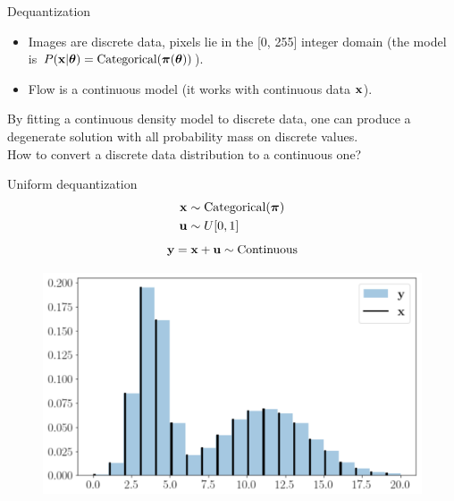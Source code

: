 \begin{frame}{Dequantization}
	\begin{itemize}
		\item Images are discrete data, pixels lie in the [0, 255] integer domain (the model is $P(\mathbf{x} | \boldsymbol{\theta}) = \text{Categorical}(\boldsymbol{\pi}(\boldsymbol{\theta}))$).
		\item Flow is a continuous model (it works with continuous data $\mathbf{x}$).
	\end{itemize}
	By fitting a continuous density model to discrete data, one can produce a degenerate solution with all probability mass on discrete values. \\
	How to convert a discrete data distribution to a continuous one?
	
	\begin{minipage}[t]{0.5\columnwidth}
		\begin{block}{Uniform dequantization}
		\vspace{-0.5cm}
			\begin{align*}
				\mathbf{x} &\sim \text{Categorical}(\boldsymbol{\pi}) \\
				 \mathbf{u} &\sim U[0, 1]
			\end{align*}
			\[
			\mathbf{y} = \mathbf{x} + \mathbf{u} \sim \text{Continuous} 
			\]
		\end{block}
	\end{minipage}%
	\begin{minipage}[t]{0.5\columnwidth}
		\begin{figure}
			\centering
			\includegraphics[width=1.0\linewidth]{figs/uniform_dequantization.png}
		\end{figure}
	\end{minipage}
\end{frame}
